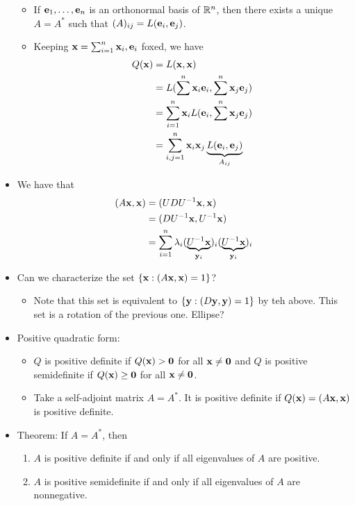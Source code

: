 \documentclass[../../notes.tex]{subfiles}
\begin{document}
\begin{itemize}
    \begin{itemize}
        \item If $\mathbf{e}_1,\dots,\mathbf{e}_n$ is an orthonormal basis of $\mathbb{R}^n$, then there exists a unique $A=A^*$ such that $(A)_{ij}=L(\mathbf{e}_i,\mathbf{e}_j)$.
        \item Keeping $\mathbf{x}=\sum_{i=1}^n\mathbf{x}_i,\mathbf{e}_i$ foxed, we have
        \begin{align*}
            Q(\mathbf{x}) &= L(\mathbf{x},\mathbf{x})\\
            &= L(\sum^n\mathbf{x}_i\mathbf{e}_i,\sum^n\mathbf{x}_j\mathbf{e}_j)\\
            &= \sum_{i=1}^n\mathbf{x}_iL(\mathbf{e}_i,\sum^n\mathbf{x}_j\mathbf{e}_j)\\
            &= \sum_{i,j=1}^n\mathbf{x}_i\mathbf{x}_j\underbrace{L(\mathbf{e}_i,\mathbf{e}_j)}_{A_{ij}}
        \end{align*}
    \end{itemize}
    \item We have that
    \begin{align*}
        (A\mathbf{x},\mathbf{x}) &= (UDU^{-1}\mathbf{x},\mathbf{x})\\
        &= (DU^{-1}\mathbf{x},U^{-1}\mathbf{x})\\
        &= \sum_{i=1}^n\lambda_i(\underbrace{U^{-1}\mathbf{x}}_{\mathbf{y}_i})_i(\underbrace{U^{-1}\mathbf{x}}_{\mathbf{y}_i})_i
    \end{align*}
    \item Can we characterize the set $\{\mathbf{x}:(A\mathbf{x},\mathbf{x})=1\}$?
    \begin{itemize}
        \item Note that this set is equivalent to $\{\mathbf{y}:(D\mathbf{y},\mathbf{y})=1\}$ by teh above. This set is a rotation of the previous one. Ellipse?
    \end{itemize}
    \item Positive quadratic form:
    \begin{itemize}
        \item $Q$ is positive definite if $Q(\mathbf{x})>\bm{0}$ for all $\mathbf{x}\neq\bm{0}$ and $Q$ is positive semidefinite if $Q(\mathbf{x})\geq\bm{0}$ for all $\mathbf{x}\neq\bm{0}$.
        \item Take a self-adjoint matrix $A=A^*$. It is positive definite if $Q(\mathbf{x})=(A\mathbf{x},\mathbf{x})$ is positive definite.
    \end{itemize}
    \item Theorem: If $A=A^*$, then
    \begin{enumerate}
        \item $A$ is positive definite if and only if all eigenvalues of $A$ are positive.
        \item $A$ is positive semidefinite if and only if all eigenvalues of $A$ are nonnegative.

\end{enumerate}
\end{itemize}
\end{document}
